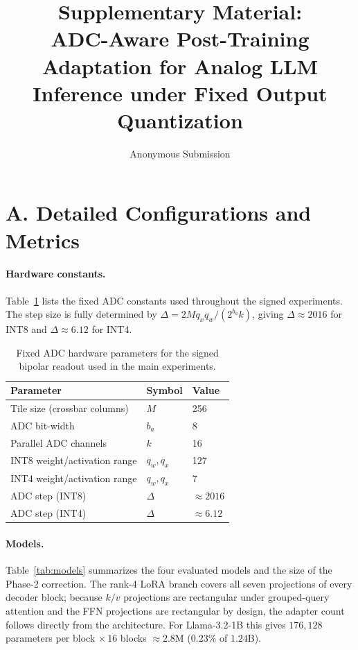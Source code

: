 \documentclass[letterpaper]{article} %
\title{Supplementary Material:\\ADC-Aware Post-Training Adaptation for Analog LLM Inference under Fixed Output Quantization}
\author{Anonymous Submission}
\theoremstyle{plain}
\begin{document}
\maketitle

\section{A. Detailed Configurations and Metrics}

\paragraph{Hardware constants.}
Table~\ref{tab:hardware} lists the fixed ADC constants used throughout the signed experiments. The step size is fully determined by $\Delta = 2Mq_xq_w/(2^{b_a}k)$, giving $\Delta \approx 2016$ for INT8 and $\Delta \approx 6.12$ for INT4.

\begin{table}[tb]
\centering
\begin{tabular}{@{}lll@{}}
\toprule
\textbf{Parameter} & \textbf{Symbol} & \textbf{Value} \\
\midrule
Tile size (crossbar columns) & $M$ & 256 \\
ADC bit-width                & $b_a$ & 8 \\
Parallel ADC channels        & $k$ & 16 \\
INT8 weight/activation range & $q_w,q_x$ & 127 \\
INT4 weight/activation range & $q_w,q_x$ & 7 \\
ADC step (INT8)              & $\Delta$ & $\approx 2016$ \\
ADC step (INT4)              & $\Delta$ & $\approx 6.12$ \\
\bottomrule
\end{tabular}
\caption{Fixed ADC hardware parameters for the signed bipolar readout used in the main experiments.}
\label{tab:hardware}
\end{table}

\paragraph{Models.}
Table~\ref{tab:models} summarizes the four evaluated models and the size of the Phase-2 correction. The rank-4 LoRA branch covers all seven projections of every decoder block; because $k/v$ projections are rectangular under grouped-query attention and the FFN projections are rectangular by design, the adapter count follows directly from the architecture. For Llama-3.2-1B this gives $176{,}128$ parameters per block $\times\,16$ blocks $\approx 2.8$M ($0.23\%$ of $1.24$B).
\end{document}
